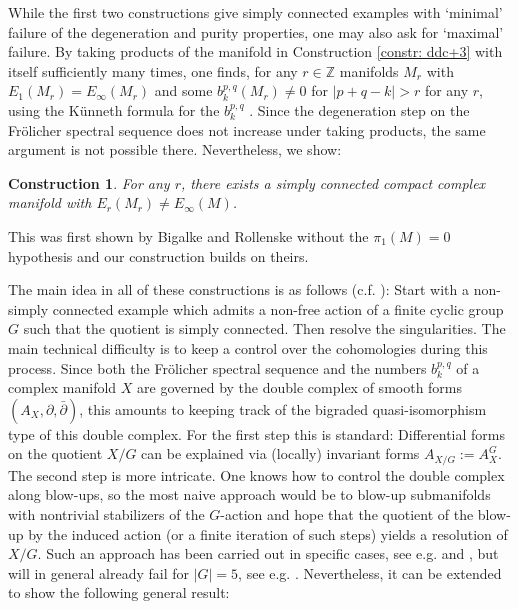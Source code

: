 \documentclass[12pt,reqno]{amsart}
\newtheorem{constr}{Construction}
\theoremstyle{definition}
\newcommand{\Z}{\mathbb{Z}}
\newcommand{\del}{\partial}
\newcommand{\delbar}{\bar{\del}}
\begin{document}
While the first two constructions give simply connected examples with `minimal' failure of the degeneration and purity properties, one may also ask for `maximal' failure. By taking products of the manifold in Construction \ref{constr: ddc+3} with itself sufficiently many times, one finds, for any $r\in\Z$ manifolds $M_r$ with $E_1(M_r)=E_\infty(M_r)$ and some $b_k^{p,q}(M_r)\neq 0$ for $|p+q-k|>r$ for any $r$, using the K\"unneth formula for the $b_k^{p,q}$ \cite[Prop. 5.8]{Ste22}. Since the degeneration step on the Fr\"olicher spectral sequence does not increase under taking products, the same argument is not possible there. Nevertheless, we show:
\begin{constr}\label{constr: FSSpi1}
For any $r$, there exists a simply connected compact complex manifold with $E_r(M_r)\neq E_\infty(M)$.
\end{constr}
This was first shown by Bigalke and Rollenske \cite{BR14} without the $\pi_1(M)=0$ hypothesis and our construction builds on theirs. 

The main idea in all of these constructions is as follows (c.f. \cite{FM08, Gua95}): Start with a non-simply connected example which admits a non-free action of a finite cyclic group $G$ such that the quotient is simply connected. Then resolve the singularities. The main technical difficulty is to keep a control over the cohomologies during this process. Since both the Fr\"olicher spectral sequence and the numbers $b_k^{p,q}$ of a complex manifold $X$ are governed by the double complex of smooth forms $(A_X,\del,\delbar)$, this amounts to keeping track of the bigraded quasi-isomorphism type of this double complex. For the first step this is standard: Differential forms on the quotient $X/G$ can be explained via (locally) invariant forms $A_{X/G}:=A_{X}^G$. The second step is more intricate. One knows how to control the double complex along blow-ups, so the most naive approach would be to blow-up submanifolds with nontrivial stabilizers of the $G$-action and hope that the quotient of the blow-up by the induced action (or a finite iteration of such steps) yields a resolution of $X/G$. Such an approach has been carried out in specific cases, see e.g. \cite{ASTT} and \cite{ST22}, but will in general already fail for $|G|=5$, see e.g. \cite{Star, Oda88}. Nevertheless, it can be extended to show the following general result:
\end{document}
